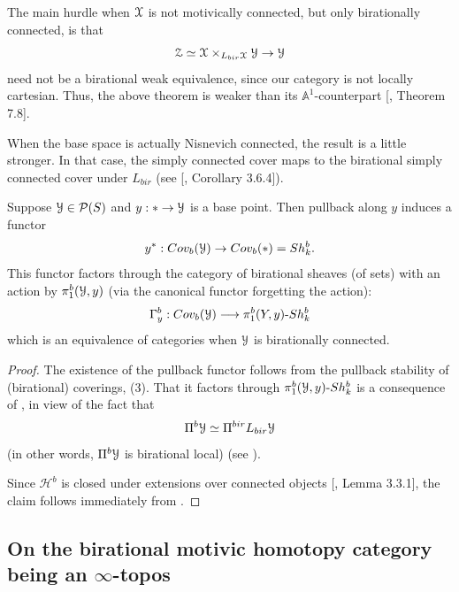 \begin{rem}
     The main hurdle when $\EuScript{X}$ is not motivically connected, but only birationally connected, is that $$\EuScript{Z}\simeq \EuScript{X}\times _{L_{bir}\EuScript{X}}\EuScript{Y}\to \EuScript{Y}$$ need not be a birational weak equivalence, since our category is not locally cartesian. Thus, the above theorem is weaker than its $\mathbb{A}^1$-counterpart [\cite{morel2012a1}, Theorem 7.8].
\end{rem}

\begin{rem}
When the base space is actually Nisnevich connected, the result is a little stronger. In that case, the simply connected cover maps to the birational simply connected cover under $L_{bir}$ (see [\cite{0bat}, Corollary 3.6.4]).\end{rem}
\begin{prop}
Suppose $\EuScript{Y}\in \mathcal{P}(S)$ and $y:*\to \EuScript{Y}$ is a base point. Then pullback along $y$ induces a functor $$y^*:Cov_{b}(\EuScript{{Y}})\to Cov_{b}(*)=Sh^{b}_k.$$ This functor factors through the category of birational sheaves (of sets) with an action by $\pi_1^{b}(\EuScript{Y},y)$ (via the canonical functor forgetting the action):  $$\Gamma_y^{b}:Cov_{b}(\EuScript{{Y}})\longrightarrow \pi_1^{b}(Y,y)\mbox{-}Sh^{b}_k$$ which is an equivalence of categories when $\EuScript{Y}$ is birationally connected.
\end{prop}
\begin{proof}
The existence of the pullback functor follows from the pullback stability of (birational) coverings,  (3). That it factors through $\pi_1^{b}(\EuScript{Y},y)\mbox{-}Sh^{b}_k$ is a consequence of , in view of the fact that $$\Pi^{b}\EuScript{Y}\simeq \Pi^{bir}L_{bir}\EuScript{Y}$$ (in other words, $\Pi^{b}\EuScript{Y}$ is birational local) (see ).

Since $\mathcal{H}^{b}$ is closed under extensions over connected objects [\cite{0bat}, Lemma 3.3.1], the claim follows immediately from .
\end{proof}

\subsection{On the birational motivic homotopy category being an \texorpdfstring{$\infty$}{}-topos}

